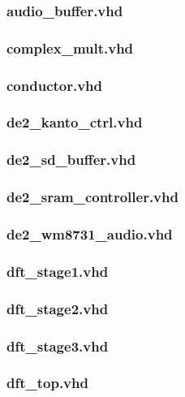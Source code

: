 \documentclass{article}
\begin{document}
	\subsubsection{audio\_buffer.vhd}
	
	\subsubsection{complex\_mult.vhd}
	
	\subsubsection{conductor.vhd}
	
	\subsubsection{de2\_kanto\_ctrl.vhd}
	
	\subsubsection{de2\_sd\_buffer.vhd}
	
	\subsubsection{de2\_sram\_controller.vhd}
	
	\subsubsection{de2\_wm8731\_audio.vhd}
	
	\subsubsection{dft\_stage1.vhd}
	
	\subsubsection{dft\_stage2.vhd}
	
	\subsubsection{dft\_stage3.vhd}
	
	\subsubsection{dft\_top.vhd}
	
\end{document}

